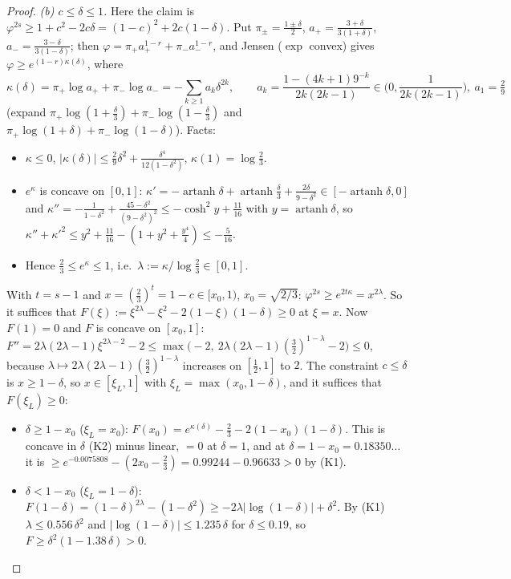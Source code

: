 \documentclass[11pt]{article}
\theoremstyle{remark}\newtheorem{remark}[theorem]{Remark}
\begin{document}
\begin{proof}
\emph{(b) $c\le\delta\le1$.}  Here the claim is $\varphi^{2s}\ge1+c^2-2c\delta=(1-c)^2+2c(1-\delta)$.
Put $\pi_\pm=\frac{1\pm\delta}2$, $a_+=\frac{3+\delta}{3(1+\delta)}$, $a_-=\frac{3-\delta}{3(1-\delta)}$; then $\varphi=\pi_+a_+^{1-r}+\pi_-a_-^{1-r}$, and Jensen
($\exp$ convex) gives $\varphi\ge e^{(1-r)\kappa(\delta)}$, where
\[\kappa(\delta)=\pi_+\log a_++\pi_-\log a_-=-\sum_{k\ge1}a_k\delta^{2k},\qquad a_k=\frac{1-(4k+1)9^{-k}}{2k(2k-1)}\in\Big(0,\frac1{2k(2k-1)}\Big),\ a_1=\tfrac29\]
(expand $\pi_+\log(1+\frac\delta3)+\pi_-\log(1-\frac\delta3)$ and $\pi_+\log(1+\delta)+\pi_-\log(1-\delta)$).  Facts:
\begin{itemize}
\item[(K1)] $\kappa\le0$, $|\kappa(\delta)|\le\frac29\delta^2+\frac{\delta^4}{12(1-\delta^2)}$, $\kappa(1)=\log\frac23$.
\item[(K2)] $e^{\kappa}$ is concave on $[0,1]$: $\kappa'=-\operatorname{artanh}\delta+\operatorname{artanh}\frac\delta3+\frac{2\delta}{9-\delta^2}\in[-\operatorname{artanh}\delta,0]$ and
$\kappa''=-\frac1{1-\delta^2}+\frac{45-\delta^2}{(9-\delta^2)^2}\le-\cosh^2y+\frac{11}{16}$ with $y=\operatorname{artanh}\delta$, so
$\kappa''+\kappa'^2\le y^2+\frac{11}{16}-(1+y^2+\frac{y^4}4)\le-\frac5{16}$.
\item[(K3)] Hence $\frac23\le e^\kappa\le1$, i.e.\ $\lambda:=\kappa/\log\frac23\in[0,1]$.
\end{itemize}
With $t=s-1$ and $x=(\frac23)^t=1-c\in[x_0,1)$, $x_0=\sqrt{2/3}$: $\varphi^{2s}\ge e^{2t\kappa}=x^{2\lambda}$.  So it suffices that
$F(\xi):=\xi^{2\lambda}-\xi^2-2(1-\xi)(1-\delta)\ge0$ at $\xi=x$.  Now $F(1)=0$ and $F$ is concave on $[x_0,1]$:
$F''=2\lambda(2\lambda-1)\xi^{2\lambda-2}-2\le\max\big(-2,\ 2\lambda(2\lambda-1)(\tfrac32)^{1-\lambda}-2\big)\le0$, because
$\lambda\mapsto2\lambda(2\lambda-1)(\frac32)^{1-\lambda}$ increases on $[\frac12,1]$ to $2$.  The constraint $c\le\delta$ is $x\ge1-\delta$, so $x\in[\xi_L,1]$
with $\xi_L=\max(x_0,1-\delta)$, and it suffices that $F(\xi_L)\ge0$:
\begin{itemize}
\item $\delta\ge1-x_0$ ($\xi_L=x_0$): $F(x_0)=e^{\kappa(\delta)}-\frac23-2(1-x_0)(1-\delta)$.  This is concave in $\delta$ (K2) minus linear, $=0$ at
$\delta=1$, and at $\delta=1-x_0=0.18350\ldots$ it is $\ge e^{-0.0075808}-(2x_0-\frac23)=0.99244-0.96633>0$ by (K1).
\item $\delta<1-x_0$ ($\xi_L=1-\delta$): $F(1-\delta)=(1-\delta)^{2\lambda}-(1-\delta^2)\ge-2\lambda|\log(1-\delta)|+\delta^2$.  By (K1)
$\lambda\le0.556\,\delta^2$ and $|\log(1-\delta)|\le1.235\,\delta$ for $\delta\le0.19$, so $F\ge\delta^2(1-1.38\,\delta)>0$.\qedhere
\end{itemize}
\end{proof}
\end{document}
